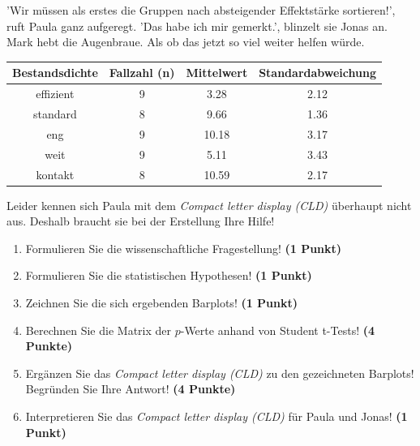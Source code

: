 \documentclass[a4paper, 9pt]{scrartcl}\usepackage[]{graphicx}\usepackage[]{xcolor}
\newenvironment{knitrout}{}{} %
\begin{document}
'Wir müssen als erstes die Gruppen nach absteigender Effektstärke sortieren!', ruft Paula ganz aufgeregt. 'Das habe ich mir gemerkt.', blinzelt sie Jonas an. Mark hebt die Augenbraue. Als ob das jetzt so viel weiter helfen würde.

\begin{knitrout}
\color{fgcolor}\begin{table}[!h]
\centering\begingroup\fontsize{10}{12}\selectfont

\begin{tabular}{cccc}
\toprule
\textbf{Bestandsdichte} & \textbf{Fallzahl (n)} & \textbf{Mittelwert} & \textbf{Standardabweichung}\\
\midrule
effizient & 9 & 3.28 & 2.12\\
standard & 8 & 9.66 & 1.36\\
eng & 9 & 10.18 & 3.17\\
weit & 9 & 5.11 & 3.43\\
kontakt & 8 & 10.59 & 2.17\\
\bottomrule
\end{tabular}
\endgroup{}
\end{table}

\end{knitrout}

Leider kennen sich Paula mit dem \textit{Compact letter display (CLD)} überhaupt nicht aus. Deshalb braucht sie bei der Erstellung Ihre Hilfe!

\begin{enumerate}
  \item Formulieren Sie die wissenschaftliche Fragestellung! \textbf{(1 Punkt)}
  \item Formulieren Sie die statistischen Hypothesen! \textbf{(1 Punkt)}
\item Zeichnen Sie die sich ergebenden Barplots! \textbf{(1 Punkt)}
\item Berechnen Sie die Matrix der $p$-Werte anhand von Student t-Tests! \textbf{(4 Punkte)}
\item Ergänzen Sie das \textit{Compact letter display (CLD)} zu den gezeichneten Barplots! Begründen Sie Ihre Antwort! \textbf{(4 Punkte)}
\item Interpretieren Sie das \textit{Compact letter display (CLD)} für Paula und Jonas! \textbf{(1 Punkt)} 
\end{enumerate}

 
\clearpage
\end{document}
